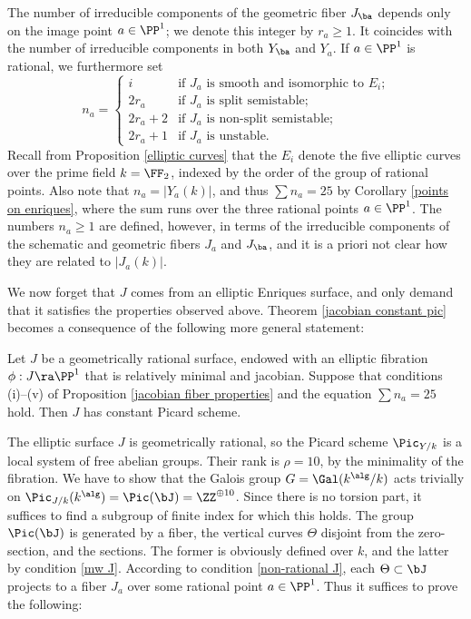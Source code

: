 The number of irreducible components   of the geometric fiber $J_\ba$ depends only on the image point $a\in \PP^1$;
we denote this integer by $r_a\geq 1$. It coincides with the number of irreducible components in both $Y_\ba$ and $Y_a$.
If $a\in\PP^1$ is rational, we furthermore set
$$
n_a=
\begin{cases}
i		& \text{if $J_a$ is smooth and isomorphic to $E_i$;}\\
2r_a 	& \text{if $J_a$ is split semistable;}\\
2r_a+2	& \text{if $J_a$ is non-split semistable;}\\
2r_a+1	& \text{if $J_a$ is unstable.}
\end{cases}
$$
Recall from Proposition \ref{elliptic curves} that the $E_i$ denote the five elliptic curves over the prime field
$k=\FF_2$,  indexed by the order of the group of  rational points.
Also note  that $n_a=| Y_a(k)|$, and thus
$\sum n_a=25$ by  Corollary \ref{points on enriques}, where the sum runs over the three rational points $a\in\PP^1$.
The numbers $n_a\geq 1$ are defined,  however,
in terms of the irreducible components of the schematic and geometric fibers $J_a$ and $J_\ba$, and it is a priori not clear
how they  are related to $|J_a(k)|$.

We now forget that $J$ comes from an elliptic Enriques surface,
and only demand that it satisfies the properties  observed above.
Theorem \ref{jacobian constant pic} becomes a consequence of the following more general statement:

\begin{theorem}
\notready
\label{constant pic}
Let $J$ be a geometrically rational surface, endowed with
an elliptic fibration $\phi:J\ra\PP^1$ that is relatively minimal and jacobian.
Suppose that conditions {\rm (i)--(v)} of Proposition \ref{jacobian fiber properties} and the equation $\sum n_a=25$ hold.
Then $J$ has constant Picard scheme.
\end{theorem}

The elliptic surface $J$ is geometrically rational, so the Picard scheme $\Pic_{Y/k}$ is  a local system
of free abelian groups. Their  rank is $\rho=10$, by the minimality of the fibration.
We have to show that the Galois group $G=\Gal(k^\alg/k)$ acts trivially on $\Pic_{J/k}(k^\alg)=\Pic(\bJ)=\ZZ^{\oplus 10}$.
Since there is no torsion part, it suffices to find a subgroup of finite index for which this holds.
The group $\Pic(\bJ)$ is generated  by a fiber, the vertical curves $\Theta$ disjoint from the zero-section,
and the sections. The former is obviously defined over $k$, and the latter  by condition \ref{mw J}.
According to  condition \ref{non-rational J}, each $\Theta\subset\bJ$ projects to  a fiber $J_a$ over some rational point  $a\in\PP^1$.
Thus it suffices to prove the following:

